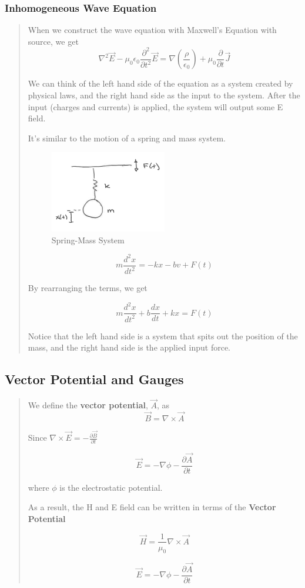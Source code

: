 \documentclass{article} %
\begin{document}
\subsubsection{Inhomogeneous Wave Equation}
\begin{quote}
    When we construct the wave equation with Maxwell's Equation with source, we get
    \[\nabla^2\vec{E}-\mu_0\epsilon_0 \frac{\partial ^2}{\partial t^2}\vec{E} = \nabla\left(\frac{\rho}{\epsilon_0}\right) + \mu_0 \frac{\partial}{\partial t} \vec{J}\]

    We can think of the left hand side of the equation as a system created by physical laws, and the right hand side as the input to the system. After the input (charges and currents) is applied, the system will output some E field.

    It's similar to the motion of a spring and mass system.

    \begin{figure}[H]
        \centering
        \includegraphics[width=0.5\textwidth]{./image/figure4.png}
        \caption{Spring-Mass System}
    \end{figure}

    \[m \frac{d^2 x}{dt^2} = -kx -bv + F(t)\]

    By rearranging the terms, we get

    \[m \frac{d^2 x}{dt^2} + b\frac{dx}{dt} + kx = F(t)\]

    Notice that the left hand side is a system that spits out the position of the mass, and the right hand side is the applied input force.
\end{quote}

\subsection{Vector Potential and Gauges}
\begin{quote}

    We define the \textbf{vector potential}, $\vec{A}$, as
    \[\vec{B} = \nabla \times \vec{A}\]

    Since $\nabla \times \vec{E} = - \frac{\partial \vec{B}}{\partial t}$




    \[\vec{E} = - \nabla \phi - \frac{\partial \vec{A}}{\partial t}\]

    where $\phi$ is the electrostatic potential.

    \bigskip
    As a result, the H and E field can be written in terms of the \textbf{Vector Potential}

    \[\vec{H} = \frac{1}{\mu_0} \nabla \times \vec{A} \]

    \[\vec{E} = -\nabla\phi - \frac{\partial \vec{A}}{\partial t}\]

\end{quote}
\end{document}

